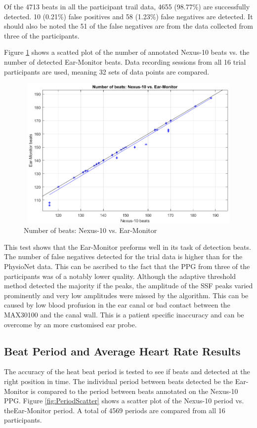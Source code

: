 Of the 4713 beats in all the participant trail data, 4655 (98.77\%) are successfully detected. 10 (0.21\%) false positives and 58 (1.23\%) false negatives are detected. It should also be noted the 51 of the false negatives are from the data collected from three of the participants.

Figure \ref{fig:BeatDetectionScatter} shows a scatted plot of the number of annotated Nexus-10 beats vs. the number of detected Ear-Monitor beats. Data recording sessions from all 16 trial participants are used, meaning 32 sets of data points are compared.

\begin{figure}[H]
   \centering
   \includegraphics[width=12cm,height=7.5cm]{figs/BeatDetectionScatter.png}
   \caption{Number of beats: Nexus-10 vs. Ear-Monitor}
   \label{fig:BeatDetectionScatter}
\end{figure}

This test shows that the Ear-Monitor preforms well in its task of detection beats. The number of false negatives detected for the trial data is higher than for the PhysioNet data. This can be ascribed to the fact that the PPG from three of the participants was of a notably lower quality. Although the adaptive threshold method detected the majority if the peaks, the amplitude of the SSF peaks varied prominently and very low amplitudes were missed by the algorithm. This can be caused by low blood profusion in the ear canal or bad contact between the MAX30100 and the canal wall. This is a patient specific inaccuracy and can be overcome by an more customised ear probe. 

\subsection{Beat Period and Average Heart Rate Results}
The accuracy of the heat beat period is tested to see if beats and detected at the right position in time. The individual period between beats detected be the Ear-Monitor is compared to the period between beats annotated on the Nexus-10 PPG. Figure \ref{fig:PeriodScatter} shows a scatter plot of the Nexus-10 period vs. theEar-Monitor period. A total of 4569 periods are compared from all 16 participants.

